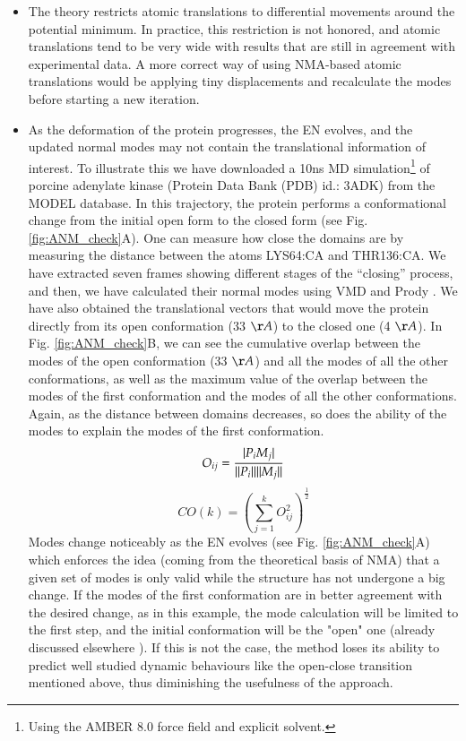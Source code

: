\begin{itemize}

\item  The theory restricts atomic translations to differential movements around the potential minimum. In practice, this restriction is not honored, and atomic translations tend to be very wide with results that are still in agreement with experimental data. A more correct way of using NMA-based atomic translations would be applying tiny displacements and recalculate the modes before starting a new iteration. 

\item  As the deformation of the protein progresses, the EN evolves, and the updated normal modes may not contain the translational information of interest. 
To illustrate this we have downloaded a 10ns MD simulation\footnote{Using the AMBER 8.0 force field and explicit solvent.} of porcine adenylate kinase (Protein Data Bank (PDB) id.: 3ADK) from the MODEL \cite{meyer_model_2010} database. In this trajectory, the protein performs a conformational change from the initial open form to the closed form (see Fig. \ref{fig:ANM_check}A). One can measure how close the domains are by measuring the distance between the atoms LYS64:CA and THR136:CA. We have extracted seven frames showing different stages of the ``closing'' process, and then, we have calculated their normal modes using VMD \cite{humphrey_vmd_1996-1} and Prody \cite{bakan_prody_2011-2}. We have also obtained the translational vectors that would move the protein directly from its open conformation (33 $\AA$) to the closed one (4 $\AA$). 
In Fig.  \ref{fig:ANM_check}B, we can see the cumulative overlap between the modes of the open conformation (33 $\AA$) and all the modes of all the other conformations, as well as the maximum value of the overlap between the modes of the first conformation and the modes of all the other conformations. Again, as the distance between domains decreases, so does the ability of the modes to explain the modes of the first conformation. 
\begin{equation}\label{eq:overlap}
O_{ij}=\frac{\vert P_i M_j\vert}{{\Arrowvert P_i\Arrowvert}{\Arrowvert M_j\Arrowvert}}
\end{equation}
\begin{equation}\label{eq:cum_overlap}
CO(k)= \left( \sum_{j=1}^kO_{ij}^2 \right)^\frac{1}{2}
\end{equation}
Modes change noticeably as the EN evolves (see Fig. \ref{fig:ANM_check}A) which enforces the idea (coming from the theoretical basis of NMA) that a given set of modes is only valid while the structure has not undergone a big change. If the modes of the first conformation are in better agreement with the desired change, as in this example, the mode calculation will be limited to the first step, and the initial conformation will be the "open" one (already discussed elsewhere \cite{tama_conformational_2001}). If this is not the case, the method loses its ability to predict well studied dynamic behaviours like the open-close transition mentioned above, thus diminishing the usefulness of the approach. 

\end{itemize}

